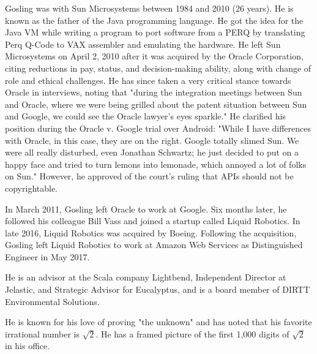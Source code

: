 \documentclass[paper = A5, headinclude, parskip = full, oneside, font = 11 pt]{report}
\begin{document}
Gosling was with Sun Microsystems between 1984 and 2010 (26 years). He is known as the father of the Java programming language. He got the idea for the Java VM while writing a program to port software from a PERQ by translating Perq Q-Code to VAX assembler and emulating the hardware. He left Sun Microsystems on April 2, 2010 after it was acquired by the Oracle Corporation, citing reductions in pay, status, and decision-making ability, along with change of role and ethical challenges. He has since taken a very critical stance towards Oracle in interviews, noting that "during the integration meetings between Sun and Oracle, where we were being grilled about the patent situation between Sun and Google, we could see the Oracle lawyer's eyes sparkle." He clarified his position during the Oracle v. Google trial over Android: "While I have differences with Oracle, in this case, they are on the right. Google totally slimed Sun. We were all really disturbed, even Jonathan Schwartz; he just decided to put on a happy face and tried to turn lemons into lemonade, which annoyed a lot of folks on Sun." However, he approved of the court's ruling that APIs should not be copyrightable.

In March 2011, Gosling left Oracle to work at Google. Six months later, he followed his colleague Bill Vass and joined a startup called Liquid Robotics. In late 2016, Liquid Robotics was acquired by Boeing. Following the acquisition, Gosling left Liquid Robotics to work at Amazon Web Services as Distinguished Engineer in May 2017.

He is an advisor at the Scala company Lightbend, Independent Director at Jelastic, and Strategic Advisor for Eucalyptus, and is a board member of DIRTT Environmental Solutions.

He is known for his love of proving "the unknown" and has noted that his favorite irrational number is $\sqrt{2}$. He has a framed picture of the first 1,000 digits of $\sqrt{2}$ in his office.

\color{red}
\end{document}
